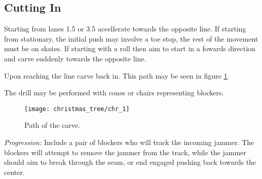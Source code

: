 \subsection*{Cutting In}
\label{drill:line_to_line_jamming:cutting}

Starting from lanes 1.5 or 3.5 accellerate towards the opposite line.
If starting from stationary, the initial push may involve a toe stop, the rest of the movement must be on skates.
If starting with a roll then aim to start in a fowards direction and carve suddenly towards the opposite line.

Upon reaching the line carve back in. 
This path may be seen in figure \ref{fig:chr_1}.


The drill may be performed with cones or chairs representing blockers. 

\begin{figure}[h]
\begin{center}
\texttt{[image: christmas\_tree/chr\_1]}
\caption{Path of the carve.\label{fig:chr_1}}
\end{center}

\end{figure}


{\it Progression:} Include a pair of blockers who will track the incoming jammer. The blockers will attempt to remove the jammer from the track, while the jammer should aim to break through the seam, or end engaged pushing back towards the center.  
